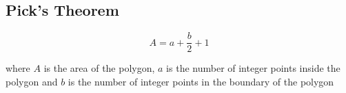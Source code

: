 \subsection{Pick's Theorem}
$$ A = a + \dfrac{b}{2} + 1 $$

where $A$ is the area of the polygon, $a$ is the number of integer points inside the polygon and $b$ is the number of integer points in the boundary of the polygon
